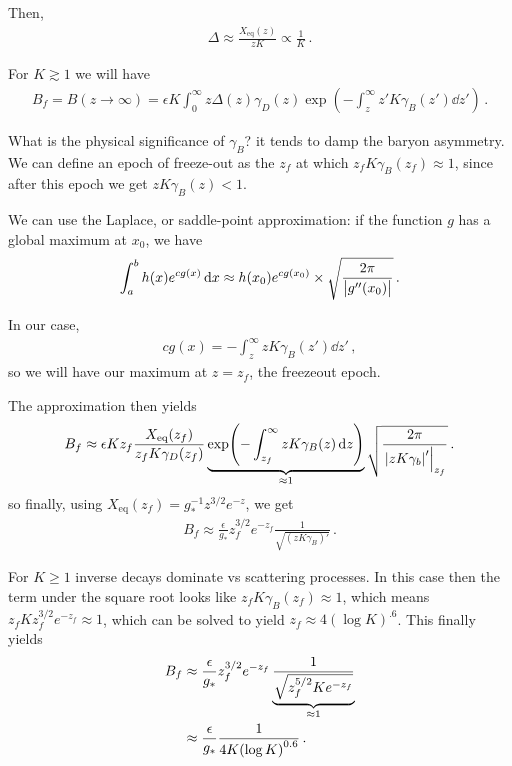 \documentclass[main.tex]{subfiles}
\begin{document}
Then, 
%
\begin{align}
\Delta \approx \frac{X _{\text{eq}}(z)}{z K} \propto \frac{1}{K}
\,.
\end{align}

For \(K \gtrsim 1\) we will have 
%
\begin{align}
B_f = B(z \to \infty) = \epsilon K \int_0^{\infty } z \Delta (z) \gamma _D (z) \exp(- \int_{z}^{\infty } z' K \gamma _B (z') \dd{z'})
\,.
\end{align}

What is the physical significance of \(\gamma _B\)? it tends to damp the baryon asymmetry. 
We can define an epoch of freeze-out as the \(z_f\) at which \(z_f K \gamma _B (z_f) \approx 1\), since after this epoch we get \(z K \gamma _B (z) < 1\).

We can use the Laplace, or saddle-point approximation: if the function \(g\) has a global maximum at \(x_0 \), we have
%
\begin{align}
\int_{a}^{b} h(x) e^{c g(x)} \dd{x} \approx h(x_0 ) e^{c g(x_0 )} \times \sqrt{\frac{2 \pi }{\abs{g'' (x_0 )}}}
\,.
\end{align}

In our case, 
%
\begin{align}
c g(x) = - \int_{z}^{\infty } z K \gamma _B (z') \dd{z'}
\,,
\end{align}
%
so we will have our maximum at \(z = z_f\), the freezeout epoch. 

The approximation then yields 
%
\begin{align}
B_f \approx \epsilon K z_f \frac{X _{\text{eq}} (z_f)}{z_f K \gamma _D (z_f)} \underbrace{\exp(- \int_{z_f}^{\infty} z K \gamma _B (z) \dd{z})}_{\approx 1}
\sqrt{ \frac{2 \pi }{\eval{\abs{zK \gamma _b}'}_{z_f}}}
\,.
\end{align}
%
so finally, using \(X _{\text{eq}} (z_f) = g_*^{-1} z^{3/2} e^{-z}\), we get
%
\begin{align}
B_f \approx \frac{\epsilon}{g_*}z_f^{3/2} e^{-z_f} \frac{1}{\sqrt{(z K \gamma _B)'}}
\,.
\end{align}

For \(K \geq 1\) inverse decays dominate vs scattering processes. In this case then the term under the square root looks like \(z_f K \gamma _B (z_f) \approx 1\), which means \(z_f K z_f^{3/2} e^{-z_f} \approx 1\), which can be solved to yield \(z_f \approx 4 (\log K)^{\num{.6}} \).
This finally yields
%
\begin{align}
B_f &\approx \frac{\epsilon}{g_*} z_f^{3/2} e^{-z_f} \underbrace{\frac{1}{\sqrt{z_f^{5/2} K e^{-z_f}}}}_{\approx 1}  \\
&\approx \frac{\epsilon}{g_*} \frac{1}{4 K \qty(\log K)^{\num{.6}}}
\,.
\end{align}
\end{document}
